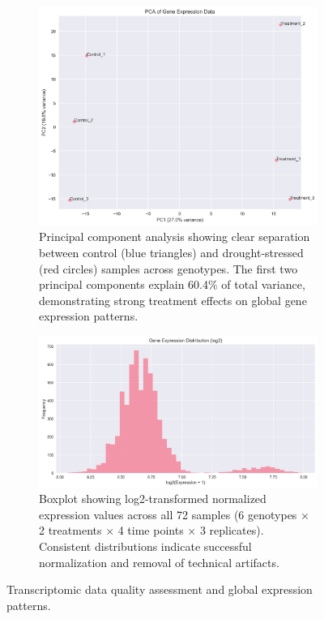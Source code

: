 \documentclass[11pt,a4paper]{article}
\begin{document}
\begin{figure}[H]
    \centering
    \begin{subfigure}[b]{0.48\textwidth}
        \includegraphics[width=\textwidth]{figures/pca_plot.png}
        \caption{Principal component analysis showing clear separation between control (blue triangles) and drought-stressed (red circles) samples across genotypes. The first two principal components explain 60.4\% of total variance, demonstrating strong treatment effects on global gene expression patterns.}
        \label{fig:pca}
    \end{subfigure}
    \hfill
    \begin{subfigure}[b]{0.48\textwidth}
        \includegraphics[width=\textwidth]{figures/expression_distribution.png}
        \caption{Boxplot showing log2-transformed normalized expression values across all 72 samples (6 genotypes × 2 treatments × 4 time points × 3 replicates). Consistent distributions indicate successful normalization and removal of technical artifacts.}
        \label{fig:expression_dist}
    \end{subfigure}
    \caption{Transcriptomic data quality assessment and global expression patterns.}
    \label{fig:overview}
\end{figure}
\end{document}
